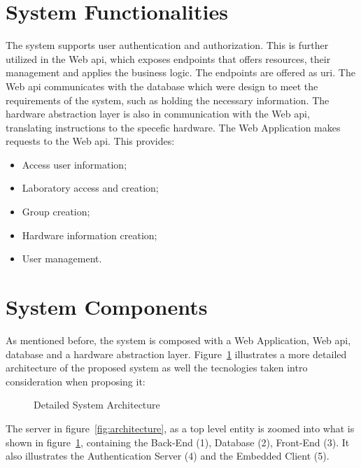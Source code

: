 \section{System Functionalities} \label{sec:system_functionalities}
The system supports user authentication and authorization. This is further utilized in the Web \acs{api}, which exposes endpoints that offers resources, their management and applies the business logic. The endpoints are offered as \ac{uri}. The Web \acs{api} communicates with the database which were design to meet the requirements of the system, such as holding the necessary information. The hardware abstraction layer is also in communication with the Web \acs{api}, translating instructions to the specefic hardware. The Web Application makes requests to the Web \acs{api}. This provides:

\begin{itemize}
    \item Access user information;
    \item Laboratory access and creation;
    \item Group creation;
    \item Hardware information creation;
    \item User management.
\end{itemize}

\section{System Components} \label{sec:system_components}
As mentioned before, the system is composed with a Web Application, Web \acs{api}, database and a hardware abstraction layer. Figure~\ref{fig:detailed_architecture} illustrates a more detailed architecture of the proposed system as well the tecnologies taken intro consideration when proposing it: 

\begin{figure}[H]
    \centering
    
\caption{Detailed System Architecture}
\label{fig:detailed_architecture}
\end{figure}

The server in figure~\ref{fig:architecture}, as a top level entity is zoomed into what is shown in figure~\ref{fig:detailed_architecture}, containing the Back-End (1), Database (2), Front-End (3). It also illustrates the Authentication Server (4) and the Embedded Client (5). 

